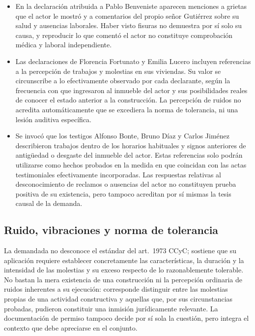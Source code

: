 \documentclass[12pt,oneside]{book}
\begin{document}
\begin{itemize}
    \item En la declaraci\'on atribuida a Pablo Benveniste aparecen menciones a grietas que el actor le mostr\'o y a comentarios del propio se\~nor Guti\'errez sobre su salud y ausencias laborales. Haber visto fisuras no demuestra por s\'i solo su causa, y reproducir lo que coment\'o el actor no constituye comprobaci\'on m\'edica y laboral independiente.
    \item Las declaraciones de Florencia Fortunato y Emilia Lucero incluyen referencias a la percepci\'on de trabajos y molestias en sus viviendas. Su valor se circunscribe a lo efectivamente observado por cada declarante, seg\'un la frecuencia con que ingresaron al inmueble del actor y sus posibilidades reales de conocer el estado anterior a la construcci\'on. La percepci\'on de ruidos no acredita autom\'aticamente que se excediera la norma de tolerancia, ni una lesi\'on auditiva espec\'ifica.
    \item Se invoc\'o que los testigos Alfonso Bonte, Bruno D\'iaz y Carlos Jim\'enez describieron trabajos dentro de los horarios habituales y signos anteriores de antig\"uedad o desgaste del inmueble del actor. Estas referencias solo podr\'an utilizarse como hechos probados en la medida en que coincidan con las actas testimoniales efectivamente incorporadas. Las respuestas relativas al desconocimiento de reclamos o ausencias del actor no constituyen prueba positiva de su existencia, pero tampoco acreditan por s\'i mismas la tesis causal de la demanda.
\end{itemize}

\subsection{Ruido, vibraciones y norma de tolerancia}

La demandada no desconoce el est\'andar del art.~1973 CCyC; sostiene que su aplicaci\'on requiere establecer concretamente las caracter\'isticas, la duraci\'on y la intensidad de las molestias y su exceso respecto de lo razonablemente tolerable. No bastan la mera existencia de una construcci\'on ni la percepci\'on ordinaria de ruidos inherentes a su ejecuci\'on: corresponde distinguir entre las molestias propias de una actividad constructiva y aquellas que, por sus circunstancias probadas, pudieron constituir una inmisi\'on jur\'idicamente relevante. La documentaci\'on de permiso tampoco decide por s\'i sola la cuesti\'on, pero integra el contexto que debe apreciarse en el conjunto.
\end{document}

